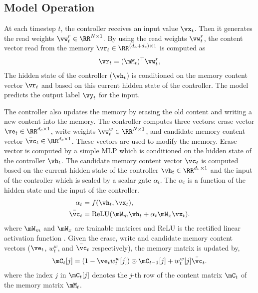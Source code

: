 \documentclass[12pt]{article}
\begin{document}
\subsection{Model Operation}

At each timestep $t$, the controller receives an input value $\vx_t$. Then it generates the read weights $\vw^r_t \in \RR^{N \times 1}$. By using the read weights $\vw^r_t$, the content vector read from the memory $\vr_t \in \RR^{(d_a + d_c) \times 1}$ is computed as
\begin{align}
    \label{eq:read_with_attention}
    \vr_t =  (\mM_{t})^{\top} \vw^r_t,
\end{align}
The hidden state of the controller ($\vh_t$) is conditioned on the memory content vector $\vr_t$ and based on this current hidden state of the controller. The model predicts the output label $\vy_t$ for the input. 

The controller also updates the memory by erasing the old content and writing a new content into the memory. The controller computes three vectors: erase vector $\ve_t \in \RR^{d_c \times 1}$, write weights $\vw^w_t \in \RR^{N \times 1}$, and candidate memory content vector $\bar{\vc}_t \in \RR^{d_c \times 1}$. These vectors are used to modify the memory. Erase vector is computed by a simple MLP which is conditioned on the hidden state of the controller $\vh_t$. The candidate memory content vector $\bar{\vc}_t$ is computed based on the current hidden state of the controller $\vh_{t} \in \RR^{d_h \times 1}$ and the input of the controller which is scaled by a scalar gate $\alpha_t$. The $\alpha_t$ is a function of the hidden state and the input of the controller. 
\begin{align}
       \alpha_t &= f(\vh_t, \vx_t), \\
        \label{eqn:cand_memory_content}
       \bar{\vc}_t &= \text{ReLU}(\mW_m \vh_t + \alpha_t \mW_x \vx_t).
\end{align}
where $\mW_m$ and $\mW_x$ are trainable matrices and $\text{ReLU}$ is the rectified linear activation function \citep{nair2010rectified}. Given the erase, write and candidate memory content vectors ($\ve_t$, $w_t^w$, and $\bar{\vc}_t$ respectively), the memory matrix is updated by,
\begin{align}
\label{eq:write_with_attention}
\mC_t[j] = (1 - \ve_t w^w_t[j]) \odot \mC_{t-1}[j] + w^w_t[j] \bar{\vc}_{t}.
\end{align}
where the index $j$ in $\mC_t[j]$ denotes the $j$-th row of the content matrix $\mC_t$ of the memory matrix $\mM_t$.
\end{document}
